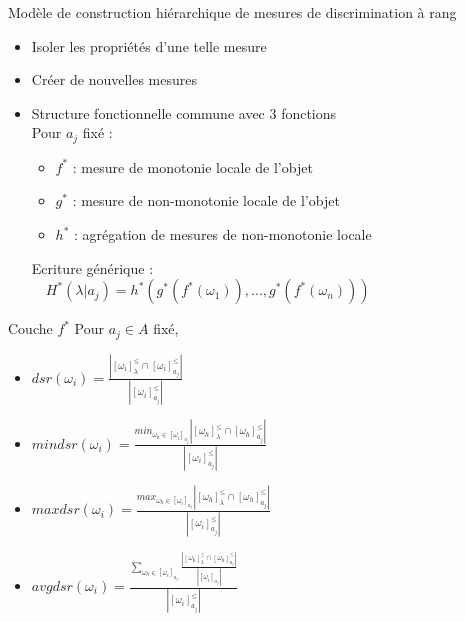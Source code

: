 \documentclass{beamer}
\newcommand{\beamcite}[1]{\hfill {\footnotesize \textcite{#1}}}
\newcommand{\myfrac}[2]{\frac{\displaystyle {#1}}{\displaystyle {#2}}}
\begin{document}
\begin{frame}{Modèle de construction hiérarchique de mesures de discrimination à rang \beamcite{marsala-rank}}
\begin{itemize}
\item Isoler les propriétés d'une telle mesure
\item Créer de nouvelles mesures
\item Structure fonctionnelle commune avec 3 fonctions \\
Pour $a_j$ fixé :
\begin{itemize}
\item $f^*$ : mesure de monotonie locale de l'objet
\item $g^*$ : mesure de non-monotonie locale de l'objet
\item $h^*$ : agrégation de mesures de non-monotonie locale
\end{itemize}
Ecriture générique : \\~\
$H^*(\lambda | a_j) = h^*(g^*(f^*(\omega_1)),...,g^*(f^*(\omega_n)))$
\end{itemize}
\end{frame}


\begin{frame}{Couche $f^*$}
    Pour $a_j \in A$ fixé,
    \begin{itemize}
        \item $dsr(\omega_i) = \myfrac{| [\omega_i]^{\leq}_{\lambda} \cap [\omega_i]^{\leq}_{a_j}|}{| [\omega_i]^{\leq}_{a_j} |}$
        \item $mindsr(\omega_i) = \myfrac{min_{\omega_h \in [\omega_i]_{a_j}} |[\omega_h]^{\leq}_{\lambda} \cap [\omega_h]^{\leq}_{a_j}|}{| [\omega_i]^{\leq}_{a_j} |}$
        \item $maxdsr(\omega_i) = \myfrac{max_{\omega_h \in [\omega_i]_{a_j}} |[\omega_h]^{\leq}_{\lambda} \cap [\omega_h]^{\leq}_{a_j}|}{| [\omega_i]^{\leq}_{a_j} |}$
        \item $avgdsr(\omega_i) = \myfrac{\displaystyle\sum_{\omega_h \in [\omega_i]_{a_j}} \myfrac{|[\omega_h]^{\leq}_{\lambda} \cap [\omega_h]^{\leq}_{a_j}|}{|[\omega_i]_{a_j}|}}{| [\omega_i]^{\leq}_{a_j} |}$
    \end{itemize}
\end{frame}
\end{document}
